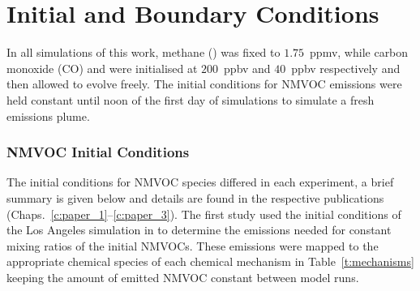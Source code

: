 \section{Initial and Boundary Conditions} \label{s:initial_conditions}
In all simulations of this work, methane () was fixed to $1.75$~ppmv, while carbon monoxide (CO) and  were initialised at $200$~ppbv and $40$~ppbv respectively and then allowed to evolve freely.
The initial conditions for NMVOC emissions were held constant until noon of the first day of simulations to simulate a fresh emissions plume.

\subsubsection{NMVOC Initial Conditions} 
The initial conditions for NMVOC species differed in each experiment, a brief summary is given below and details are found in the respective publications (Chaps.~\ref{c:paper_1}--\ref{c:paper_3}).
The first study used the initial conditions of the Los Angeles simulation in \citet{Butler:2011} to determine the emissions needed for constant mixing ratios of the initial NMVOCs.
These emissions were mapped to the appropriate chemical species of each chemical mechanism in Table~\ref{t:mechanisms} keeping the amount of emitted NMVOC constant between model runs.

